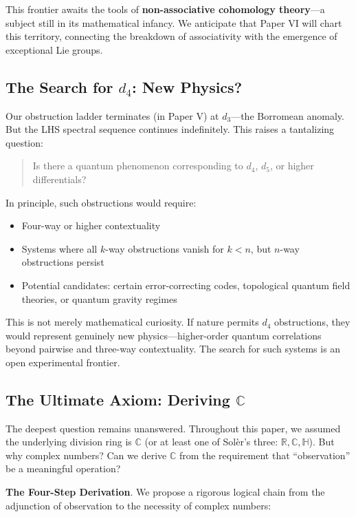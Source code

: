 \documentclass[11pt]{article}
\begin{document}
This frontier awaits the tools of \textbf{non-associative cohomology theory}---a subject still in its mathematical infancy. We anticipate that Paper VI will chart this territory, connecting the breakdown of associativity with the emergence of exceptional Lie groups.

\subsection{The Search for $d_4$: New Physics?}
\label{search-d4}

Our obstruction ladder terminates (in Paper V) at $d_3$---the Borromean anomaly. But the LHS spectral sequence continues indefinitely. This raises a tantalizing question:

\begin{quote}
Is there a quantum phenomenon corresponding to $d_4$, $d_5$, or higher differentials?
\end{quote}

In principle, such obstructions would require:
\begin{itemize}
\item Four-way or higher contextuality
\item Systems where all $k$-way obstructions vanish for $k < n$, but $n$-way obstructions persist
\item Potential candidates: certain error-correcting codes, topological quantum field theories, or quantum gravity regimes
\end{itemize}

This is not merely mathematical curiosity. If nature permits $d_4$ obstructions, they would represent genuinely new physics---higher-order quantum correlations beyond pairwise and three-way contextuality. The search for such systems is an open experimental frontier.

\subsection{The Ultimate Axiom: Deriving $\mathbb{C}$}
\label{ultimate-axiom}

The deepest question remains unanswered. Throughout this paper, we assumed the underlying division ring is $\mathbb{C}$ (or at least one of Sol\`{e}r's three: $\mathbb{R}, \mathbb{C}, \mathbb{H}$). But why complex numbers? Can we derive $\mathbb{C}$ from the requirement that ``observation'' be a meaningful operation?

\textbf{The Four-Step Derivation}.
We propose a rigorous logical chain from the adjunction of observation to the necessity of complex numbers:
\end{document}
